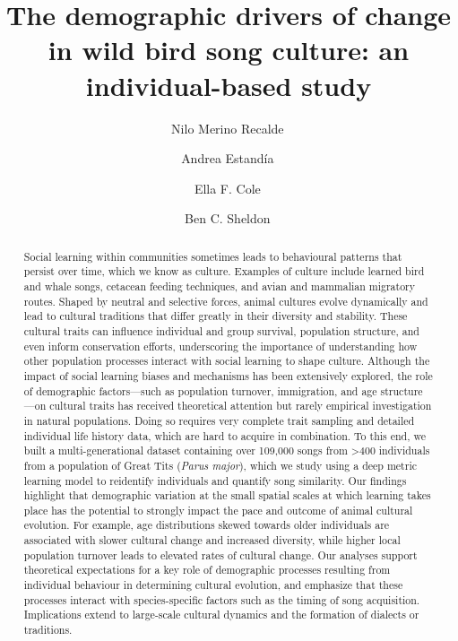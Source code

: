 \documentclass[9pt, twocolumn, twoside]{gsajnl}
\begin{document}
\title{The demographic drivers of change in wild bird song culture: an individual-based study}
\author[1,$\ast$]{Nilo Merino Recalde\,} 
\author[1]{Andrea Estandía\,}
\author[1]{Ella F. Cole\,} 
\author[1]{Ben C. Sheldon\,} 




\begin{abstract}
Social learning within communities sometimes leads to behavioural patterns that persist over time, which we know as culture. Examples of culture include learned bird and whale songs, cetacean feeding techniques, and avian and mammalian migratory routes. Shaped by neutral and selective forces, animal cultures evolve dynamically and lead to cultural traditions that differ greatly in their diversity and stability. These cultural traits can influence individual and group survival, population structure, and even inform conservation efforts, underscoring the importance of understanding how other population processes interact with social learning to shape culture. Although the impact of social learning biases and mechanisms has been extensively explored, the role of demographic factors---such as population turnover, immigration, and age structure---on cultural traits has received theoretical attention but rarely empirical investigation in natural populations. Doing so requires very complete trait sampling and detailed individual life history data, which are hard to acquire in combination. To this end, we built a multi-generational dataset containing over 109,000 songs from >400 individuals from a population of Great Tits (\textit{Parus major}), which we study using a deep metric learning model to reidentify individuals and quantify song similarity. Our findings highlight that demographic variation at the small spatial scales at which learning takes place has the potential to strongly impact the pace and outcome of animal cultural evolution. For example, age distributions skewed towards older individuals are associated with slower cultural change and increased diversity, while higher local population turnover leads to elevated rates of cultural change. Our analyses support theoretical expectations for a key role of demographic processes resulting from individual behaviour in determining cultural evolution, and emphasize that these processes interact with species-specific factors such as the timing of song acquisition. Implications extend to large-scale cultural dynamics and the formation of dialects or traditions.
\end{abstract}
\end{document}
